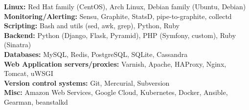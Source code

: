 \documentclass[margin,line]{resume}
\begin{document}
\begin{resume}
    \textbf{Linux:} Red Hat family (CentOS), Arch Linux, Debian family (Ubuntu, Debian)\\
    \textbf{Monitoring/Alerting:} Sensu, Graphite, StatsD, pipe-to-graphite, collectd\\
    \textbf{Scripting:} Bash and utils (sed, awk, grep), Python, Ruby\\
    \textbf{Backend:} Python (Django, Flask, Pyramid), PHP (Symfony, custom), Ruby (Sinatra)\\
    \textbf{Databases:} MySQL, Redis, PostgreSQL, SQLite, Cassandra\\
    \textbf{Web Application servers/proxies:} Varnish, Apache, HAProxy, Nginx, Tomcat, uWSGI\\
    \textbf{Version control systems:} Git, Mercurial, Subversion\\
    \textbf{Misc:} Amazon Web Services, Google Cloud, Kubernetes, Docker, Ansible, Gearman, beanstalkd


\end{resume}
\end{document}
